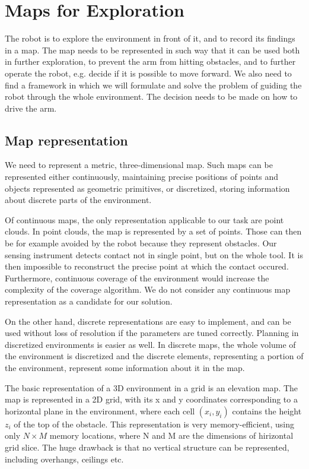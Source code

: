 \documentclass[buriama8_dp.tex]{subfiles}
\begin{document}
\chapter{Maps for Exploration}
\label{chap:expl}

The robot is to explore the environment in front of it, and to record its findings in a map. The map needs to be represented in such way that it can be used both in further exploration, to prevent the arm from hitting obstacles, and to further operate the robot, e.g. decide if it is possible to move forward. We also need to find a framework in which we will formulate and solve the problem of guiding the robot through the whole environment. The decision needs to be made on how to drive the arm.

\section{Map representation}

We need to represent a metric, three-dimensional map. Such maps can be represented either continuously, maintaining precise positions of points and objects represented as geometric primitives, or discretized, storing information about discrete parts of the environment.

Of continuous maps, the only representation applicable to our task are point clouds. In point clouds, the map is represented by a set of points. Those can then be for example avoided by the robot because they represent obstacles. Our sensing instrument detects contact not in single point, but on the whole tool. It is then impossible to reconstruct the precise point at which the contact occured. Furthermore, continuous coverage of the environment would increase the complexity of the coverage algorithm. We do not consider any continuous map representation as a candidate for our solution.

On the other hand, discrete representations are easy to implement, and can be used without loss of resolution if the parameters are tuned correctly. Planning in discretized environments is easier as well. In discrete maps, the whole volume of the environment is discretized and the discrete elements, representing a portion of the environment, represent some information about it in the map.

The basic representation of a 3D environment in a grid is an elevation map. The map is represented in a 2D grid, with its \m x and \m y coordinates corresponding to a horizontal plane in the environment, where each cell \((x_i, y_i)\) contains the height \(z_i\) of the top of the obstacle. This representation is very memory-efficient, using only \(N \times M\) memory locations, where \m N and \m M are the dimensions of hirizontal grid slice. The huge drawback is that no vertical structure can be represented, including overhangs, ceilings etc.
\end{document}
